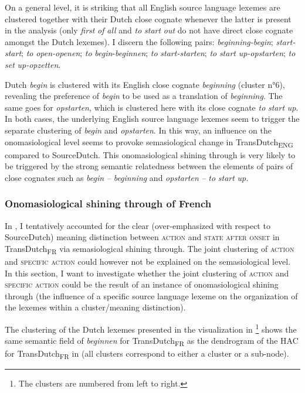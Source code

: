 On a general level, it is striking that all English source language lexemes are clustered together with their Dutch close cognate whenever the latter is present in the analysis (only \textit{first} \textit{of} \textit{all} and \textit{to} \textit{start} \textit{out} do not have direct close cognate amongst the Dutch lexemes). I discern the following pairs: \textit{beginning-begin}; \textit{start-start}; \textit{to} \textit{open-openen}; \textit{to} \textit{begin}{}-\textit{beginnen}; \textit{to} \textit{start-starten}; \textit{to} \textit{start} \textit{up-opstarten}; \textit{to} \textit{set} \textit{up-opzetten}.

Dutch \textit{begin} is clustered with its English close cognate \textit{beginning} (cluster n°6), revealing the preference of \textit{begin} to be used as a translation of \textit{beginning}. The same goes for \textit{opstarten}, which is clustered here with its close cognate \textit{to} \textit{start} \textit{up}. In both cases, the underlying English source language lexemes seem to trigger the separate clustering of \textit{begin} and \textit{opstarten}. In this way, an influence on the onomasiological level seems to provoke semasiological change in TransDutch\textsubscript{ENG} compared to SourceDutch. This onomasiological shining through is very likely to be triggered by the strong semantic relatedness between the elements of pairs of close cognates such as \textit{begin} \textit{–} \textit{beginning} and \textit{opstarten} \textit{–} \textit{to} \textit{start} \textit{up.}

\subsubsection{Onomasiological shining through of French}
\label{sec:4.6.2.2}  
In , I tentatively accounted for the clear (over-emphasized with respect to SourceDutch) meaning distinction between \textsc{action} and \textsc{state after onset} in TransDutch\textsubscript{FR} via semasiological shining through. The joint clustering of \textsc{action} and {\textsc{specific}} \textsc{action} could however not be explained on the semasiological level. In this section, I want to investigate whether the joint clustering of \textsc{action} and {\textsc{specific}} \textsc{action} could be the result of an instance of onomasiological shining through (the influence of a specific source language lexeme on the organization of the lexemes within a cluster\slash meaning distinction).

The clustering of the Dutch lexemes presented in the visualization in \footnote{The clusters are numbered from left to right.} shows the same semantic field of \textit{beginnen} for TransDutch\textsubscript{FR} as the dendrogram of the HAC for TransDutch\textsubscript{FR} in  (all clusters correspond to either a cluster or a sub-node).


